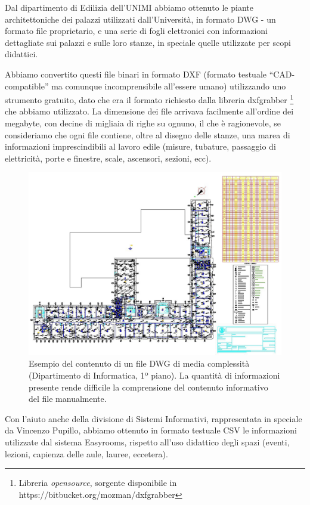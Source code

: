 \documentclass[12pt]{report}
\begin{document}
Dal dipartimento di Edilizia dell'UNIMI abbiamo ottenuto le piante architettoniche dei palazzi utilizzati dall'Università, in formato DWG - un formato file proprietario, e una serie di fogli elettronici con informazioni dettagliate sui palazzi e sulle loro stanze, in speciale quelle utilizzate per scopi didattici.

Abbiamo convertito questi file binari in formato DXF (formato testuale ``CAD-compatible'' ma comunque incomprensibile all'essere umano) utilizzando uno strumento gratuito, dato che era il formato richiesto dalla libreria dxfgrabber \footnote{Libreria \textit{opensource}, sorgente disponibile in https://bitbucket.org/mozman/dxfgrabber} che abbiamo utilizzato. La dimensione dei file arrivava facilmente all'ordine dei megabyte, con decine di migliaia di righe su ognuno, il che è ragionevole, se consideriamo che ogni file contiene, oltre al disegno delle stanze, una marea di informazioni imprescindibili al lavoro edile (misure, tubature, passaggio di elettricità, porte e finestre, scale, ascensori, sezioni, ecc).

\begin{figure}[h]
    \centering
    \includegraphics[width=\textwidth]{03-dxf-chaos.jpg}
    \caption{Esempio del contenuto di un file DWG di media complessità (Dipartimento di Informatica, 1º piano). La quantità di informazioni presente rende difficile la comprensione del contenuto informativo del file manualmente. }
    \label{fig:dxf_chaos}
\end{figure}

Con l'aiuto anche della divisione di Sistemi Informativi, rappresentata in speciale da Vincenzo Pupillo, abbiamo ottenuto in formato testuale CSV le informazioni utilizzate dal sistema Easyrooms, rispetto all'uso didattico degli spazi (eventi, lezioni, capienza delle aule, lauree, eccetera).
\end{document}
